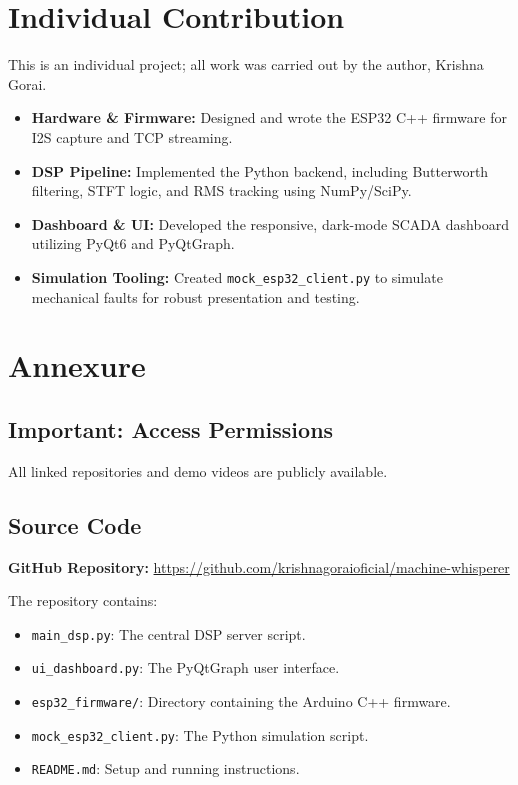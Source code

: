\documentclass[11pt,a4paper]{article}
\begin{document}
\section{Individual Contribution}
This is an individual project; all work was carried out by the author, Krishna Gorai.
\begin{itemize}
    \item \textbf{Hardware \& Firmware:} Designed and wrote the ESP32 C++ firmware for I2S capture and TCP streaming.
    \item \textbf{DSP Pipeline:} Implemented the Python backend, including Butterworth filtering, STFT logic, and RMS tracking using NumPy/SciPy.
    \item \textbf{Dashboard \& UI:} Developed the responsive, dark-mode SCADA dashboard utilizing PyQt6 and PyQtGraph.
    \item \textbf{Simulation Tooling:} Created \texttt{mock\_esp32\_client.py} to simulate mechanical faults for robust presentation and testing.
\end{itemize}

\section{Annexure}

\subsection*{Important: Access Permissions}
All linked repositories and demo videos are publicly available.

\subsection{Source Code}
\textbf{GitHub Repository:} \url{https://github.com/krishnagoraioficial/machine-whisperer}
\vspace{0.2cm}

The repository contains:
\begin{itemize}
    \item \texttt{main\_dsp.py}: The central DSP server script.
    \item \texttt{ui\_dashboard.py}: The PyQtGraph user interface.
    \item \texttt{esp32\_firmware/}: Directory containing the Arduino C++ firmware.
    \item \texttt{mock\_esp32\_client.py}: The Python simulation script.
    \item \texttt{README.md}: Setup and running instructions.
\end{itemize}
\end{document}
